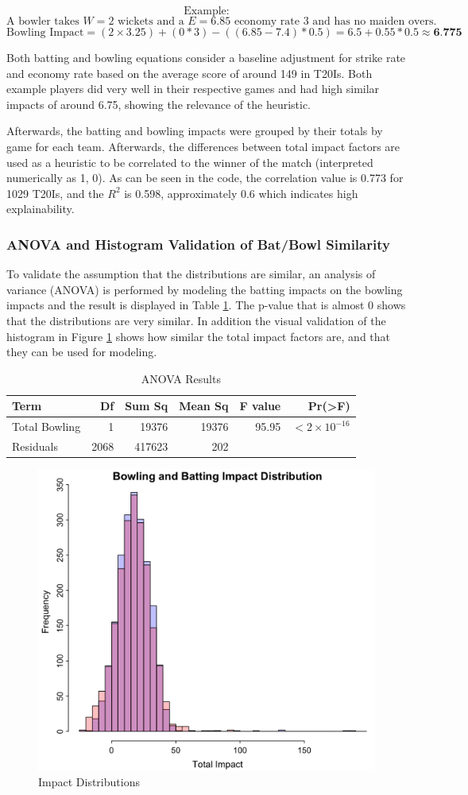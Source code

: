 \documentclass{article}[12pt]
\begin{document}
\[
\text{Example:}
\]
\[
\text{A bowler takes } W = 2 \text{ wickets and a } E = 6.85 \text{ economy rate } 3 \text{ and has no maiden overs.}
\]
\[
\text{Bowling Impact} = (2 \times 3.25) + (0 * 3) - ((6.85 - 7.4) * 0.5) = 6.5 + 0.55 * 0.5 \approx \textbf{6.775}
\]

Both batting and bowling equations consider a baseline adjustment for strike rate and economy rate based on the average score of around 149 in T20Is. \parencite{statsguru_2025_total} Both example players did very well in their respective games and had high similar impacts of around 6.75, showing the relevance of the heuristic.

Afterwards, the batting and bowling impacts were grouped by their totals by game for each team. Afterwards, the differences between total impact factors are used as a heuristic to be correlated to the winner of the match (interpreted numerically as 1, 0). As can be seen in the code, the correlation value is 0.773 for 1029 T20Is, and the \(R^2\) is 0.598, approximately 0.6 which indicates high explainability.

\subsubsection{ANOVA and Histogram Validation of Bat/Bowl Similarity}
To validate the assumption that the distributions are similar, an analysis of variance (ANOVA) is performed by modeling the batting impacts on the bowling impacts and the result is displayed in Table \ref{tab:anova_results}. The p-value that is almost 0 shows that the distributions are very similar. In addition the visual validation of the histogram in Figure \ref{fig:imdist} shows how similar the total impact factors are, and that they can be used for modeling.
\begin{table}[!ht]
\centering
\begin{tabular}{lrrrrr}
\textbf{Term} & \textbf{Df} & \textbf{Sum Sq} & \textbf{Mean Sq} & \textbf{F value} & \textbf{Pr(>F)} \\
\hline
Total Bowling & 1 & 19376 & 19376 & 95.95 & $< 2 \times 10^{-16}$ \\
Residuals & 2068 & 417623 & 202 & & \\
\hline
\end{tabular}
\caption{ANOVA Results}
\label{tab:anova_results}
\end{table}
\begin{figure}[!h]
    \centering
    \includegraphics[width=0.5\linewidth]{impact_dist.png}
    \caption{Impact Distributions}
    \label{fig:imdist}
\end{figure}
\end{document}
